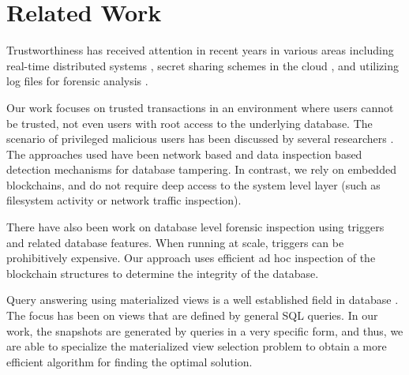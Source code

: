 \section{Related Work}

Trustworthiness has received attention in recent years in various areas
including real-time distributed systems \cite{khayat2017trust}, secret
sharing schemes in the cloud \cite{dutta2013privacy}, and utilizing log files
for forensic analysis \cite{sinha2014continuous}.  

Our work focuses on trusted
transactions in an environment where users cannot be trusted, not even users
with root access to the underlying database. The scenario of privileged
malicious users has been discussed by several researchers
\cite{crosby2009tamper-evident,wagner2018detect,wanger2017carving}. The
approaches
used have been network based and data inspection based detection mechanisms for
database tampering.  In contrast, we rely on embedded blockchains, and do not
require deep access to the system level layer (such as filesystem activity or
network traffic inspection).

There have also been work on database level forensic inspection
\cite{fabbri2013select,hauger2014information} using triggers and related database
features.  When running at scale, triggers can be prohibitively expensive.  Our
approach uses efficient ad hoc inspection of the blockchain structures
to determine the integrity of the database.

Query answering using materialized views is a well established field in database
\cite{du2017deepsea,sohrabi2016materialized,shukla1998materialized,aouiche2006clustering}.
The focus has been on views that are defined by general SQL queries.  In our
work, the snapshots are generated by queries in a very specific form, and thus, we
are able to specialize the materialized view selection problem to obtain a
more efficient algorithm for finding the optimal solution.
